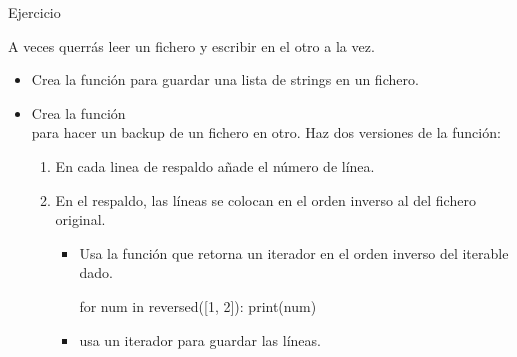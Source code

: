 \documentclass[10pt, envcountsect , spanish]{beamer}
\begin{document}
\begin{frame}[fragile]{Ejercicio} 

\begin{ejercicio}{}
A veces querrás leer un fichero y escribir en el otro a la vez.




\begin{itemize}

\item
Crea la función  para guardar una lista de strings en un fichero.

\item
Crea la función  \\
para hacer un backup de un fichero en otro. Haz dos versiones de la función:

\begin{enumerate}
\item 
En cada linea de respaldo añade el número  de línea.

\item
En el respaldo, las líneas se colocan en el orden inverso al del fichero original. 

\begin{itemize}
\item Usa la función  que retorna un iterador en el orden inverso del iterable dado.
{\footnotesize
\begin{pyconsole}[][frame=single, fontsize=\scriptsize]
for num in reversed([1, 2]):
  print(num)

\end{pyconsole}
}

\item {} usa un iterador para guardar las líneas.

\end{itemize}
\end{enumerate}

\end{itemize}
\end{ejercicio}


\end{frame}
\end{document}
